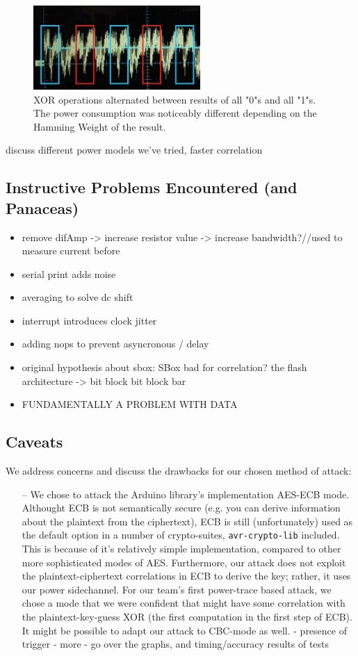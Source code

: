 \documentclass[journal]{ieee_style}
\begin{document}
\begin{figure}[!t]
\centering
\includegraphics[width=2.5in]{XOR_PC}
\caption{XOR operations alternated between results of all "0"s and all "1"s. The power consumption was noticeably different depending on the Hamming Weight of the result.}
\label{fig_sim}
\end{figure}

 discuss different power models we've tried, faster correlation

\subsection{Instructive Problems Encountered (and Panaceas)}


\begin{itemize}[-]
\item remove difAmp -> increase resistor value -> increase bandwidth?//used to measure current before
\item serial print adds noise
\item averaging to solve dc shift
\item interrupt introduces clock jitter
\item adding nops to prevent asyncronous / delay
\item original hypothesis about sbox:  SBox bad for correlation? the flash architecture -> bit block bit block bar
\item FUNDAMENTALLY A PROBLEM WITH DATA
\end{itemize}
\subsection{Caveats}
We address concerns and discuss the drawbacks for our chosen method of attack:
\begin{itemize}
    \item[--] We chose to attack the Arduino library's implementation AES-ECB mode. Althought ECB is not semantically secure (e.g. you can derive information about the plaintext from the ciphertext), ECB is still (unfortunately) used as the default option in a number of crypto-suites, \texttt{avr-crypto-lib} included. This is because of it's relatively simple implementation, compared to other more sophisticated modes of AES. Furthermore, our attack does not exploit the plaintext-ciphertext correlations in ECB to derive the key; rather, it uses our power sidechannel. For our team's first power-trace based attack, we chose a mode that we were confident that might have some correlation with the plaintext-key-guess XOR (the first computation in the first step of ECB). It might be possible to adapt our attack to CBC-mode as well.
- presence of trigger
- more
- go over the graphs, and timing/accuracy results of tests
\end{itemize}
\end{document}
